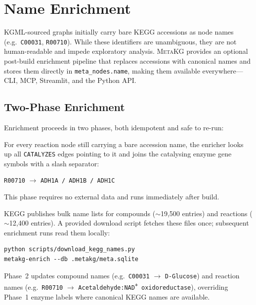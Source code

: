 \documentclass[10pt]{article}
\begin{document}
\section{Name Enrichment}
\label{sec:enrich}

KGML-sourced graphs initially carry bare KEGG accessions as node names
(e.g.\ \texttt{C00031}, \texttt{R00710}). While these identifiers are
unambiguous, they are not human-readable and impede exploratory analysis.
\textsc{MetaKG} provides an optional post-build enrichment pipeline that
replaces accessions with canonical names and stores them directly in
\texttt{meta\_nodes.name}, making them available everywhere---CLI, MCP,
Streamlit, and the Python API.

\subsection{Two-Phase Enrichment}

Enrichment proceeds in two phases, both idempotent and safe to re-run:

\begin{description}[leftmargin=*,itemsep=3pt]
  \item[Phase~1 (no network, always runs).] For every reaction node still
    carrying a bare accession name, the enricher looks up all
    \texttt{CATALYZES} edges pointing to it and joins the catalysing enzyme
    gene symbols with a slash separator:
    \begin{center}
      \texttt{R00710} $\to$ \texttt{ADH1A / ADH1B / ADH1C}
    \end{center}
    This phase requires no external data and runs immediately after build.

  \item[Phase~2 (requires downloaded KEGG name lists).] KEGG publishes bulk
    name lists for compounds ($\sim$19,500 entries) and reactions
    ($\sim$12,400 entries). A provided download script fetches these files
    once; subsequent enrichment runs read them locally:
    \begin{lstlisting}[style=bash]
python scripts/download_kegg_names.py
metakg-enrich --db .metakg/meta.sqlite
    \end{lstlisting}
    Phase~2 updates compound names (e.g.\ \texttt{C00031} $\to$
    \texttt{D-Glucose}) and reaction names (e.g.\ \texttt{R00710} $\to$
    \texttt{Acetaldehyde:NAD\textsuperscript{+} oxidoreductase}), overriding
    Phase~1 enzyme labels where canonical KEGG names are available.
\end{description}
\end{document}
